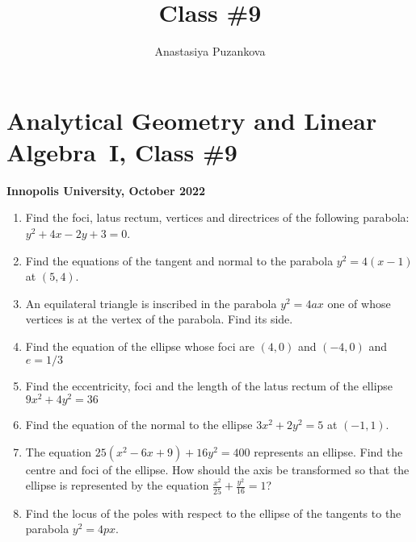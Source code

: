 \documentclass[a4paper,10pt]{article}
\title{Class \#9}
\author{Anastasiya Puzankova}
\date{}
\begin{document}
\section*{Analytical Geometry and Linear Algebra~I, Class \#9}
\noindent\textbf{Innopolis University, October 2022}
\\

\begin{enumerate}

\item %
Find the foci, latus rectum, vertices and directrices of the following parabola: 
$y^2+4x-2y+3=0$.

\item %
Find the equations of the tangent and normal to the parabola $y^2 = 4(x-1)$ at $(5, 4)$.

\item %
An equilateral triangle is inscribed in the parabola $y^2 = 4ax$ one of whose vertices is at the vertex of the parabola. Find its side.

\item %
Find the equation of the ellipse whose foci are $(4, 0)$ and $(-4, 0)$ and $e=1/3$

\item %
Find the eccentricity, foci and the length of the latus rectum of the ellipse 
$9x^2+4y^2=36$

\item %
Find the equation of the normal to the ellipse $3x^2 + 2y^2 = 5$ at $(-1, 1)$.

\item %
The equation $25(x^2 - 6x + 9) + 16y^2 = 400$ represents an ellipse. Find the centre and foci of the ellipse. How should the axis be transformed so that the ellipse is represented by the equation  $\frac{x^2}{25}+\frac{y^2}{16} = 1$?

\item %
Find the locus of the poles with respect to the ellipse of the tangents to the parabola $y^2 = 4px$.

\end{enumerate}
\end{document}
